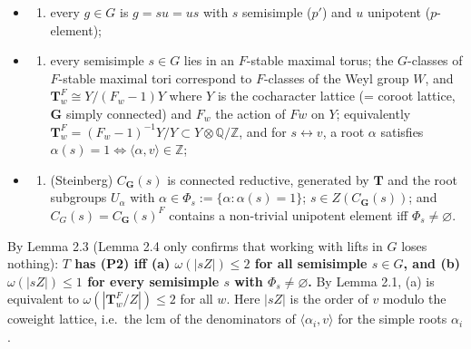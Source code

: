 \documentclass[11pt,a4paper]{article}
\providecommand{\tightlist}{\setlength{\itemsep}{1pt}\setlength{\parskip}{0pt}}
\begin{document}
\begin{itemize}
\tightlist
\item
  \begin{enumerate}
  \def\labelenumi{(\Alph{enumi})}
  \setcounter{enumi}{9}
  \tightlist
  \item
    every \(g\in G\) is \(g=su=us\) with \(s\) semisimple (\(p'\)) and
    \(u\) unipotent (\(p\)-element);
  \end{enumerate}
\item
  \begin{enumerate}
  \def\labelenumi{(\Alph{enumi})}
  \setcounter{enumi}{19}
  \tightlist
  \item
    every semisimple \(s\in G\) lies in an \(F\)-stable maximal torus;
    the \(G\)-classes of \(F\)-stable maximal tori correspond to
    \(F\)-classes of the Weyl group \(W\), and
    \(\mathbf T_w^F\cong Y/(F_w-1)Y\) where \(Y\) is the cocharacter
    lattice (= coroot lattice, \(\mathbf G\) simply connected) and
    \(F_w\) the action of \(Fw\) on \(Y\); equivalently
    \(\mathbf T_w^F=(F_w-1)^{-1}Y/Y\subset Y\otimes\mathbb Q/\mathbb Z\),
    and for \(s\leftrightarrow v\), a root \(\alpha\) satisfies
    \(\alpha(s)=1\iff\langle\alpha,v\rangle\in\mathbb Z\);
  \end{enumerate}
\item
  \begin{enumerate}
  \def\labelenumi{(\Alph{enumi})}
  \setcounter{enumi}{18}
  \tightlist
  \item
    (Steinberg) \(C_{\mathbf G}(s)\) is connected reductive, generated
    by \(\mathbf T\) and the root subgroups \(U_\alpha\) with
    \(\alpha\in\Phi_s:=\{\alpha:\alpha(s)=1\}\);
    \(s\in Z(C_{\mathbf G}(s))\); and \(C_G(s)=C_{\mathbf G}(s)^F\)
    contains a non-trivial unipotent element iff
    \(\Phi_s\ne\varnothing\).
  \end{enumerate}
\end{itemize}

By Lemma 2.3 (Lemma 2.4 only confirms that working with lifts in \(G\)
loses nothing): \textbf{\(T\) has (P2) iff (a) \(\omega(|sZ|)\le 2\) for
all semisimple \(s\in G\), and (b) \(\omega(|sZ|)\le 1\) for every
semisimple \(s\) with \(\Phi_s\neq\varnothing\).} By Lemma 2.1, (a) is
equivalent to \(\omega(|\mathbf T_w^F/Z|)\le 2\) for all \(w\). Here
\(|sZ|\) is the order of \(v\) modulo the coweight lattice, i.e.~the lcm
of the denominators of \(\langle\alpha_i,v\rangle\) for the simple roots
\(\alpha_i\).
\end{document}
